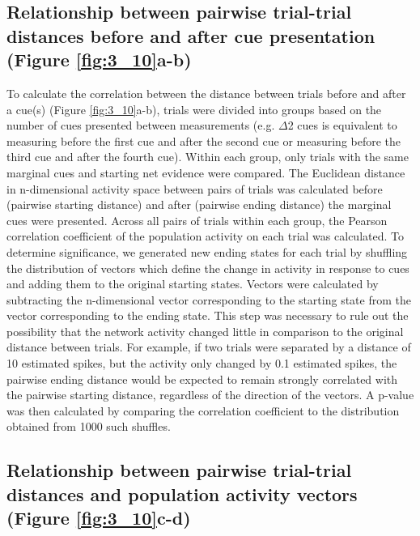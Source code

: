 \subsection[Relationship between pairwise trial-trial distances before and after cue presentation]{Relationship between pairwise trial-trial distances before and after cue presentation (Figure \ref{fig:3_10}a-b)} \label{methods:offset}

To calculate the correlation between the distance between trials before and after a cue(s) (Figure \ref{fig:3_10}a-b), trials were divided into groups based on the number of cues presented between measurements (e.g. $\Delta$2 cues is equivalent to measuring before the first cue and after the second cue or measuring before the third cue and after the fourth cue). Within each group, only trials with the same marginal cues and starting net evidence were compared. The Euclidean distance in n-dimensional activity space between pairs of trials was calculated before (pairwise starting distance) and after (pairwise ending distance) the marginal cues were presented. Across all pairs of trials within each group, the Pearson correlation coefficient of the population activity on each trial was calculated. To determine significance, we generated new ending states for each trial by shuffling the distribution of vectors which define the change in activity in response to cues and adding them to the original starting states. Vectors were calculated by subtracting the n-dimensional vector corresponding to the starting state from the vector corresponding to the ending state. This step was necessary to rule out the possibility that the network activity changed little in comparison to the original distance between trials. For example, if two trials were separated by a distance of 10 estimated spikes, but the activity only changed by 0.1 estimated spikes, the pairwise ending distance would be expected to remain strongly correlated with the pairwise starting distance, regardless of the direction of the vectors. A p-value was then calculated by comparing the correlation coefficient to the distribution obtained from 1000 such shuffles.

\subsection[Relationship between pairwise trial-trial distances and population activity vectors]{Relationship between pairwise trial-trial distances and population activity vectors (Figure \ref{fig:3_10}c-d)} \label{methods:vector}

